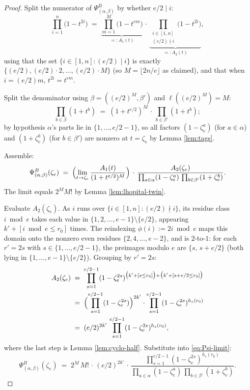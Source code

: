 \documentclass[11pt]{article}
\theoremstyle{definition}
\theoremstyle{remark}
\newcommand{\zetae}{\zeta_e}
\newcommand{\PsiB}{\Psi^{B}}
\begin{document}
\begin{proof}
Split the numerator of $\PsiB_{(\alpha, \beta)}$ by whether $e/2 \mid i$:
\begin{equation}\label{eq:num-split}
  \prod_{i=1}^n\bigl(1 - t^{2i}\bigr) \;=\; \underbrace{\prod_{m=1}^{M}\bigl(1 - t^{em}\bigr)}_{=: A_1(t)}\,\cdot\,\underbrace{\prod_{\substack{i \in [1,n] \\ (e/2) \nmid i}}\bigl(1 - t^{2i}\bigr)}_{=: A_2(t)},
\end{equation}
using that the set $\{i \in [1, n] : (e/2) \mid i\}$ is exactly $\{(e/2), (e/2) \cdot 2, \ldots, (e/2)\cdot M\}$ (so $M = \lfloor 2n/e\rfloor$ as claimed), and that when $i = (e/2)m$, $t^{2i} = t^{em}$.

Split the denominator using $\beta = ((e/2)^{M}, \beta')$ and $\ell((e/2)^M) = M$:
\begin{equation}\label{eq:den-split}
  \prod_{b \in \beta}(1 + t^b) \;=\; (1 + t^{e/2})^{M}\, \cdot\, \prod_{b \in \beta'}(1 + t^b);
\end{equation}
by hypothesis $\alpha$'s parts lie in $\{1, \ldots, e/2-1\}$, so all factors $(1 - \zetae^a)$ (for $a \in \alpha$) and $(1 + \zetae^b)$ (for $b \in \beta'$) are nonzero at $t = \zetae$ by Lemma \ref{lem:tags}.

Assemble:
\begin{equation}\label{eq:Psi-limit}
  \PsiB_{(\alpha, \beta)}(\zetae)
  \;=\; \Bigl(\lim_{t \to \zetae}\frac{A_1(t)}{(1 + t^{e/2})^{M}}\Bigr)\, \cdot\, \frac{A_2(\zetae)}{\prod_{a \in \alpha}(1 - \zetae^{a})\, \prod_{b \in \beta'}(1 + \zetae^{b})}.
\end{equation}
The limit equals $2^{M} M!$ by Lemma \ref{lem:lhopital-twin}.

Evaluate $A_2(\zetae)$. As $i$ runs over $\{i \in [1, n] : (e/2) \nmid i\}$, its residue class $i \bmod e$ takes each value in $\{1, 2, \ldots, e-1\} \setminus \{e/2\}$, appearing $k' + [i \bmod e \le r_0]$ times. The reindexing $\phi(i) := 2i \bmod e$ maps this domain onto the nonzero even residues $\{2, 4, \ldots, e-2\}$, and is $2$-to-$1$: for each $r' = 2s$ with $s \in \{1, \ldots, e/2-1\}$, the preimages modulo $e$ are $\{s,\, s + e/2\}$ (both lying in $\{1, \ldots, e-1\} \setminus \{e/2\}$). Grouping by $r' = 2s$:
\begin{align*}
  A_2(\zetae)
  &\;=\; \prod_{s=1}^{e/2-1} (1 - \zetae^{2s})^{\bigl(k' + [s \le r_0]\bigr) + \bigl(k' + [s + e/2 \le r_0]\bigr)}\\
  &\;=\; \Bigl(\prod_{s=1}^{e/2-1}(1 - \zetae^{2s})\Bigr)^{2k'} \cdot \prod_{s=1}^{e/2-1}(1 - \zetae^{2s})^{h_s(r_0)}\\
  &\;=\; (e/2)^{2k'}\, \prod_{s=1}^{e/2-1}(1 - \zetae^{2s})^{h_s(r_0)},
\end{align*}
where the last step is Lemma \ref{lem:cyclo-half}. Substitute into \eqref{eq:Psi-limit}:
\begin{equation}\label{eq:Psi-eval}
  \PsiB_{(\alpha,\beta)}(\zetae) \;=\; 2^{M}\, M!\, \cdot\, (e/2)^{2k'}\, \cdot\, \frac{\prod_{s=1}^{e/2-1}(1 - \zetae^{2s})^{h_s(r_0)}}{\prod_{a \in \alpha}(1 - \zetae^{a})\, \prod_{b \in \beta'}(1 + \zetae^{b})}.
\end{equation}


\end{proof}
\end{document}
